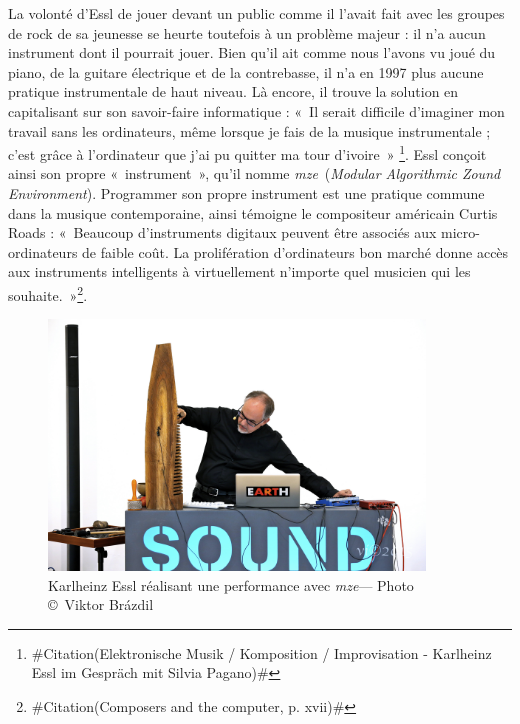 \documentclass[a4paper,12pt]{article}
\newcommand{\guill}[1]{«~#1~»}
\newcommand{\zitat}[2]{\#Citation(#2)\#}
\newcommand{\maze}[0]{\emph{m\symbol{64}ze\textdegree2}}
\begin{document}
La volonté d'Essl de jouer devant un public comme il l'avait fait avec les groupes de rock de sa jeunesse se heurte toutefois à un problème majeur : il n'a aucun instrument dont il pourrait jouer. Bien qu'il ait comme nous l'avons vu joué du piano, de la guitare électrique et de la contrebasse, il n'a en 1997 plus aucune pratique instrumentale de haut niveau. Là encore, il trouve la solution en capitalisant sur son savoir-faire informatique : \guill{Il serait difficile d'imaginer mon travail sans les ordinateurs, même lorsque je fais de la musique instrumentale ; c'est grâce à l'ordinateur que j'ai pu quitter ma tour d'ivoire}
\footnote{\zitat{Ohne Computer wäre meine Arbeit schwer vorstellbar, selbst wenn ich Instrumentalmusik mache; dadurch war es mir möglich, aus meinem kompositorischen Elfenbeinturm auszubrechen.}
{Elektronische Musik / Komposition / Improvisation - Karlheinz Essl im Gespräch mit Silvia Pagano}}. Essl conçoit ainsi son propre \guill{instrument}, qu'il nomme \maze~(\emph{Modular Algorithmic Zound Environment}). Programmer son propre instrument est une pratique commune dans la musique contemporaine, ainsi témoigne le compositeur américain Curtis Roads : \guill{Beaucoup d'instruments digitaux peuvent être associés aux micro-ordinateurs de faible coût. La prolifération d'ordinateurs bon marché donne accès aux instruments intelligents à virtuellement n'importe quel musicien qui les souhaite.}\footnote{\zitat{Many digital instruments can be attached to inexpensive personal computers. The proliferation of inexpensive computers puts the capability of intelligent instruments within the reach of virtually every musician who wants them.}
{Composers and the computer, p. xvii}}.

\begin{figure}[h!]
\begin{center}
\includegraphics[width=10cm]{images/performance.jpg}
\caption{Karlheinz Essl réalisant une performance avec \maze --- Photo \copyright~Viktor Br\'azdil}
\label{performancephoto}
\end{center}
\end{figure}
\end{document}
